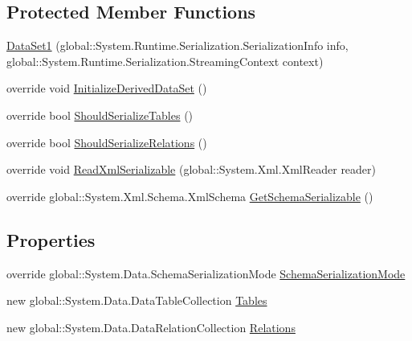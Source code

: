 \subsection*{Protected Member Functions}
\begin{DoxyCompactItemize}
\item 
\mbox{\hyperlink{classprojekt_1_1_data_set1_a276b4a5f57cb8de1a39b36dedefe7613}{Data\+Set1}} (global\+::\+System.\+Runtime.\+Serialization.\+Serialization\+Info info, global\+::\+System.\+Runtime.\+Serialization.\+Streaming\+Context context)
\item 
override void \mbox{\hyperlink{classprojekt_1_1_data_set1_a0a252a70e692ec9dc27bfe7371ce3f1b}{Initialize\+Derived\+Data\+Set}} ()
\item 
override bool \mbox{\hyperlink{classprojekt_1_1_data_set1_a3a1de8b5f42f1062608d6c1c683cd5bd}{Should\+Serialize\+Tables}} ()
\item 
override bool \mbox{\hyperlink{classprojekt_1_1_data_set1_a59de6c98c70128509a6461654eea2766}{Should\+Serialize\+Relations}} ()
\item 
override void \mbox{\hyperlink{classprojekt_1_1_data_set1_a5a88a43948496bdc4d9ddcafd794d957}{Read\+Xml\+Serializable}} (global\+::\+System.\+Xml.\+Xml\+Reader reader)
\item 
override global\+::\+System.\+Xml.\+Schema.\+Xml\+Schema \mbox{\hyperlink{classprojekt_1_1_data_set1_a33a74f619d82064876ccb5caf72a83ff}{Get\+Schema\+Serializable}} ()
\end{DoxyCompactItemize}
\subsection*{Properties}
\begin{DoxyCompactItemize}
\item 
override global\+::\+System.\+Data.\+Schema\+Serialization\+Mode \mbox{\hyperlink{classprojekt_1_1_data_set1_a427450e2d66c48970331311264026734}{Schema\+Serialization\+Mode}}
\item 
new global\+::\+System.\+Data.\+Data\+Table\+Collection \mbox{\hyperlink{classprojekt_1_1_data_set1_a1991a0961ae830e41f424a830589a720}{Tables}}
\item 
new global\+::\+System.\+Data.\+Data\+Relation\+Collection \mbox{\hyperlink{classprojekt_1_1_data_set1_a6b93e786dcf82bd1c416e96311c865e2}{Relations}}
\end{DoxyCompactItemize}


